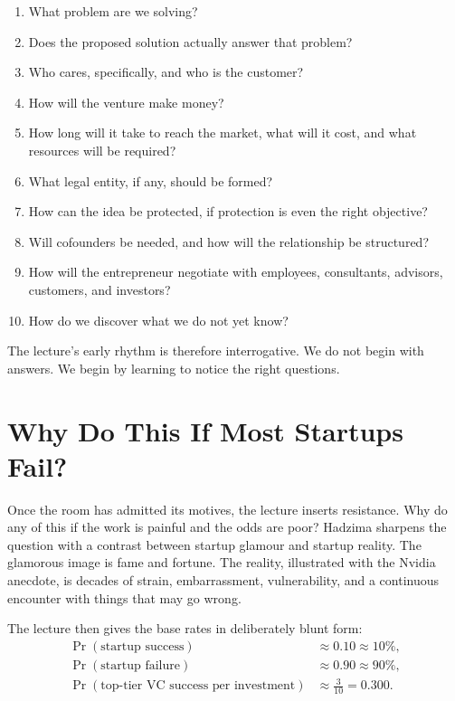 \begin{enumerate}
  \item What problem are we solving?
  \item Does the proposed solution actually answer that problem?
  \item Who cares, specifically, and who is the customer?
  \item How will the venture make money?
  \item How long will it take to reach the market, what will it cost, and what resources will be required?
  \item What legal entity, if any, should be formed?
  \item How can the idea be protected, if protection is even the right objective?
  \item Will cofounders be needed, and how will the relationship be structured?
  \item How will the entrepreneur negotiate with employees, consultants, advisors, customers, and investors?
  \item How do we discover what we do not yet know?
\end{enumerate}

The lecture's early rhythm is therefore interrogative. We do not begin with answers. We begin by learning to notice the right questions.

\section{Why Do This If Most Startups Fail?}

Once the room has admitted its motives, the lecture inserts resistance. Why do any of this if the work is painful and the odds are poor? Hadzima sharpens the question with a contrast between startup glamour and startup reality. The glamorous image is fame and fortune. The reality, illustrated with the Nvidia anecdote, is decades of strain, embarrassment, vulnerability, and a continuous encounter with things that may go wrong.

The lecture then gives the base rates in deliberately blunt form:
\begin{align}
\Pr(\text{startup success}) &\approx 0.10 \approx 10\%, \\
\Pr(\text{startup failure}) &\approx 0.90 \approx 90\%, \\
\Pr(\text{top-tier VC success per investment}) &\approx \frac{3}{10} = 0.300.
\end{align}

